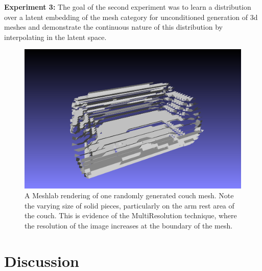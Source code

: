 \documentclass[11pt]{article}
\begin{document}
\textbf{Experiment 3:} The goal of the second experiment was to learn a distribution over a latent embedding of the mesh category for unconditioned generation of 3d meshes and demonstrate the continuous nature of this distribution by interpolating in the latent space.

\begin{figure}[h!]
  \caption{A Meshlab rendering of one randomly generated couch mesh. Note the varying size of solid pieces, particularly on the arm rest area of the couch. This is evidence of the MultiResolution technique, where the resolution of the image increases at the boundary of the mesh. }
\includegraphics[scale=0.4]{./resultImages/couch.png}
\end{figure}

\section{Discussion}
\end{document}
